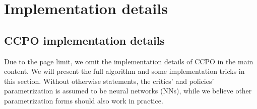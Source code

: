\section{Implementation details}
\label{section: CCPO implementation details}
\subsection{CCPO implementation details}
Due to the page limit, we omit the implementation details of CCPO in the main content. We will present the full algorithm and some implementation tricks in this section. Without otherwise statements, the critics' and policies' parametrization is assumed to be neural networks (NNs), while we believe other parametrization forms should also work in practice. 


